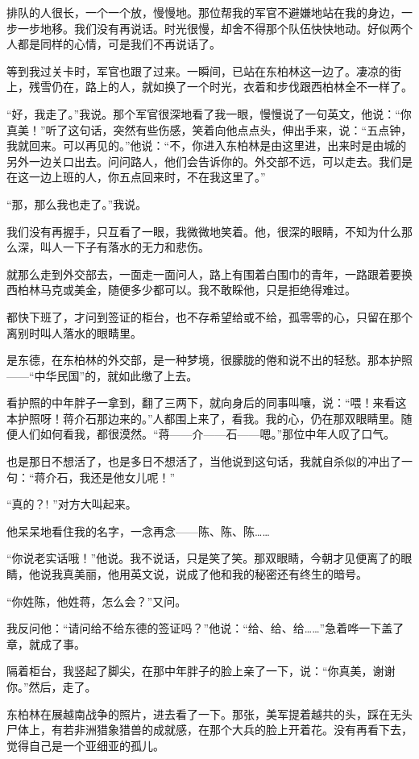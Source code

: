 \par 排队的人很长，一个一个放，慢慢地。那位帮我的军官不避嫌地站在我的身边，一步一步地移。我们没有再说话。时光很慢，却舍不得那个队伍快快地动。好似两个人都是同样的心情，可是我们不再说话了。
\par 等到我过关卡时，军官也跟了过来。一瞬间，已站在东柏林这一边了。凄凉的街上，残雪仍在，路上的人，就如换了一个时光，衣着和步伐跟西柏林全不一样了。
\par “好，我走了。”我说。那个军官很深地看了我一眼，慢慢说了一句英文，他说：“你真美！”听了这句话，突然有些伤感，笑着向他点点头，伸出手来，说：“五点钟，我就回来。可以再见的。”他说：“不，你进入东柏林是由这里进，出来时是由城的另外一边关口出去。问问路人，他们会告诉你的。外交部不远，可以走去。我们是在这一边上班的人，你五点回来时，不在我这里了。”
\par “那，那么我也走了。”我说。
\par 我们没有再握手，只互看了一眼，我微微地笑着。他，很深的眼睛，不知为什么那么深，叫人一下子有落水的无力和悲伤。
\par 就那么走到外交部去，一面走一面问人，路上有围着白围巾的青年，一路跟着要换西柏林马克或美金，随便多少都可以。我不敢睬他，只是拒绝得难过。
\par 都快下班了，才问到签证的柜台，也不存希望给或不给，孤零零的心，只留在那个离别时叫人落水的眼睛里。
\par 是东德，在东柏林的外交部，是一种梦境，很朦胧的倦和说不出的轻愁。那本护照——“中华民国”的，就如此缴了上去。
\par 看护照的中年胖子一拿到，翻了三两下，就向身后的同事叫嚷，说：“喂！来看这本护照呀！蒋介石那边来的。”人都围上来了，看我。我的心，仍在那双眼睛里。随便人们如何看我，都很漠然。“蒋——介——石——嗯。”那位中年人叹了口气。
\par 也是那日不想活了，也是多日不想活了，当他说到这句话，我就自杀似的冲出了一句：“蒋介石，我还是他女儿呢！”
\par “真的？! ”对方大叫起来。
\par 他呆呆地看住我的名字，一念再念——陈、陈、陈……
\par “你说老实话哦！”他说。我不说话，只是笑了笑。那双眼睛，今朝才见便离了的眼睛，他说我真美丽，他用英文说，说成了他和我的秘密还有终生的暗号。
\par “你姓陈，他姓蒋，怎么会？”又问。
\par 我反问他：“请问给不给东德的签证吗？”他说：“给、给、给……”急着哗一下盖了章，就成了事。
\par 隔着柜台，我竖起了脚尖，在那中年胖子的脸上亲了一下，说：“你真美，谢谢你。”然后，走了。
\par 东柏林在展越南战争的照片，进去看了一下。那张，美军提着越共的头，踩在无头尸体上，有若非洲猎象猎兽的成就感，在那个大兵的脸上开着花。没有再看下去，觉得自己是一个亚细亚的孤儿。
